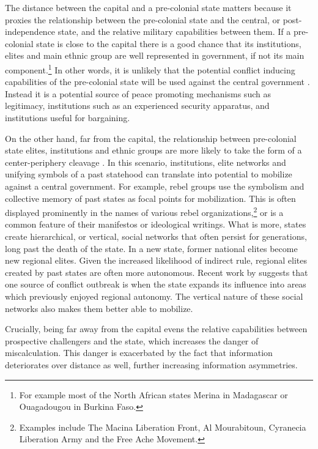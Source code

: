 The distance between the capital and a pre-colonial state matters because it
proxies the relationship between the pre-colonial state and the central, or
post-independence state, and the relative military capabilities between them. If
a pre-colonial state is close to the capital there is a good chance that its
institutions, elites and main ethnic group are well represented in government,
if not its main component.\footnote{For example most of the North African states
Merina in Madagascar or Ouagadougou in Burkina Faso.} In other words, it is
unlikely that the potential conflict inducing capabilities of the pre-colonial
state will be used against the central government \citep{Wucherpfennig2016}.
Instead it is a potential source of peace promoting mechanisms such as
legitimacy, institutions such as an experienced security apparatus, and
institutions useful for bargaining.

On the other hand, far from the capital, the relationship between pre-colonial
state elites, institutions and ethnic groups are more likely to take the form of
a center-periphery cleavage \citep{1967Psav}. In this scenario, institutions,
elite networks and unifying symbols of a past statehood can translate into
potential to mobilize against a central government. For example, rebel groups
use the symbolism and collective memory of past states as focal points for
mobilization. This is often displayed prominently in the names of various rebel
organizations,\footnote{Examples include The Macina Liberation Front, Al
Mourabitoun, Cyranecia Liberation Army and the Free Ache Movement.} or is a
common feature of their manifestos or ideological writings. What is more, states
create hierarchical, or vertical, social networks that often persist for
generations, long past the death of the state. In a new state, former national
elites become new regional elites. Given the increased likelihood of indirect
rule, regional elites created by past states are often more autonomous. Recent
work by \citet{Ying_2020} suggests that one source of conflict outbreak is when
the state expands its influence into areas which previously enjoyed regional
autonomy. The vertical nature of these social networks also makes them better
able to mobilize. 

Crucially, being far away from the capital evens the relative capabilities
between prospective challengers and the state, which increases the danger of
miscalculation. This danger is exacerbated by the fact that information
deteriorates over distance as well, further increasing information asymmetries.

